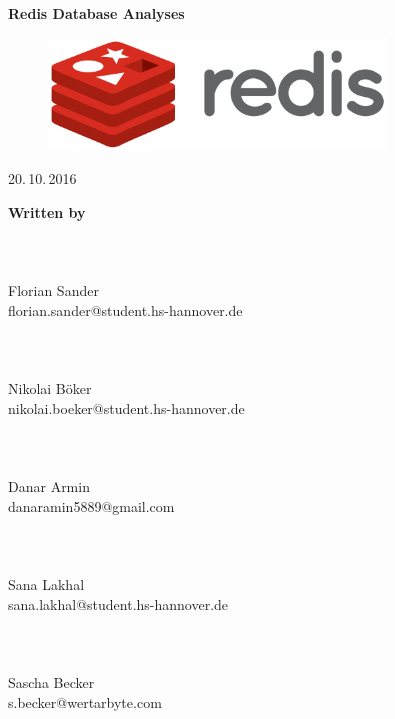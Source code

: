 \documentclass[11pt,DIV12,BCOR0mm,oneside,headings=normal,%
  numbers=noenddot,headsepline,headinclude]{scrreprt}
\begin{document}

\thispagestyle{empty}
{}

\begin{center}
  \vspace*{4\baselineskip}
  {\sffamily\bfseries\LARGE
    Redis Database Analyses\par}
  
  \vspace*{4\baselineskip}
  {\Large }

  \vfill
  {\Large }
  \begin{figure}[htb!]
  	\centerline{\includegraphics[width=0.8\textwidth]{resources/Redis_Logo.png}}
  \end{figure}
  
  
  \vspace*{4\baselineskip}
  {\Large \par}
  
  \vspace*{4\baselineskip}
  {\Large 20.\,10.\,2016}
  
  \vspace*{4\baselineskip}
\end{center}


{\huge\textbf{Written by}} \\
\\
\\
\textbf{} \\
Florian Sander \\
florian.sander@student.hs-hannover.de \\
\\
\\
\textbf{} \\
Nikolai Böker \\
nikolai.boeker@student.hs-hannover.de \\
\\
\\
\textbf{} \\
Danar Armin \\
danaramin5889@gmail.com \\
\\
\\
\textbf{} \\
Sana Lakhal \\
sana.lakhal@student.hs-hannover.de \\
\\
\\
\textbf{} \\
Sascha Becker \\
s.becker@wertarbyte.com \\
\\
\\
\\
\\
\end{document}
